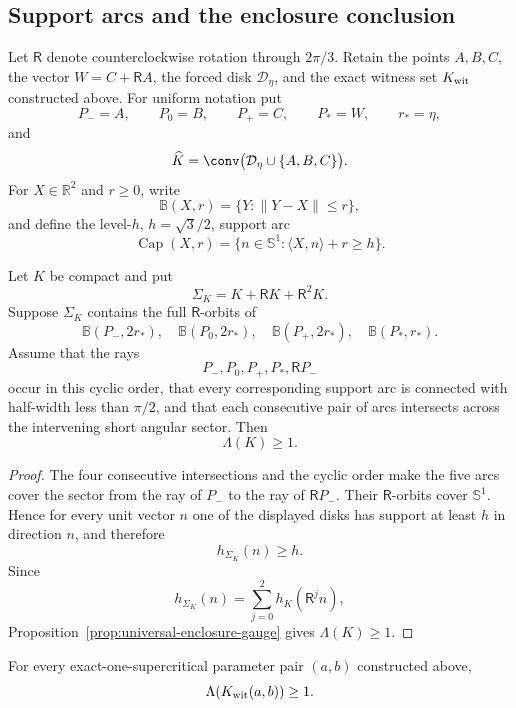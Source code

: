 \subsection{Support arcs and the enclosure conclusion}
\label{subsec:nine-point-conclusion}

Let $\mathsf R$ denote counterclockwise rotation through $2\pi/3$.  Retain
the points $A,B,C$, the vector $W=C+\mathsf RA$, the forced disk
$\mathcal D_\eta$, and the exact witness set $K_{\rm wit}$ constructed above.
For uniform notation put
\[
 P_-=A,\qquad P_0=B,\qquad P_+=C,\qquad
 P_\ast=W,\qquad r_\ast=\eta,
\]
and
\[
 \widehat K=\conv\bigl(\mathcal D_\eta\cup\{A,B,C\}\bigr).
\]
For $X\in\mathbb R^2$ and $r\ge0$, write
\[
 \mathbb B(X,r)=\{Y:\lVert Y-X\rVert\le r\},
\]
and define the level-$h$, $h=\sqrt3/2$, support arc
\[
 \operatorname{Cap}(X,r)
 =\{n\in\mathbb S^1:\langle X,n\rangle+r\ge h\}.
\]

\begin{lemma}
\label{lem:reader-cap-chain}
Let $K$ be compact and put
\[
 \Sigma_K=K+\mathsf RK+\mathsf R^2K.
\]
Suppose $\Sigma_K$ contains the full $\mathsf R$-orbits of
\[
 \mathbb B(P_-,2r_\ast),\quad
 \mathbb B(P_0,2r_\ast),\quad
 \mathbb B(P_+,2r_\ast),\quad
 \mathbb B(P_\ast,r_\ast).
\]
Assume that the rays
\[
 P_-,P_0,P_+,P_\ast,\mathsf RP_-
\]
occur in this cyclic order, that every corresponding support arc is connected
with half-width less than $\pi/2$, and that each consecutive pair of arcs
intersects across the intervening short angular sector.  Then
\[
 \Lambda(K)\ge1.
\]
\end{lemma}



\begin{proof}
The four consecutive intersections and the cyclic order make the five arcs
cover the sector from the ray of $P_-$ to the ray of $\mathsf RP_-$.  Their
$\mathsf R$-orbits cover $\mathbb S^1$.  Hence for every unit vector $n$ one
of the displayed disks has support at least $h$ in direction $n$, and
therefore
\[
 h_{\Sigma_K}(n)\ge h.
\]
Since
\[
 h_{\Sigma_K}(n)=\sum_{j=0}^2h_K(\mathsf R^jn),
\]
Proposition~\ref{prop:universal-enclosure-gauge} gives $\Lambda(K)\ge1$.
\end{proof}

\begin{theorem}
\label{thm:reader-witness-enclosure}
For every exact-one-supercritical parameter pair $(a,b)$ constructed above,
\[
 \Lambda(K_{\rm wit}(a,b))\ge1.
\]
\end{theorem}

